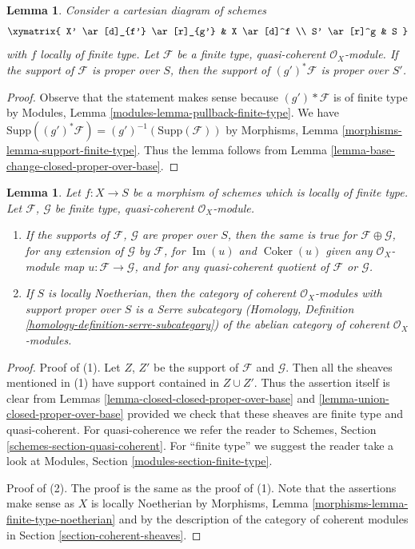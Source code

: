 \documentclass[10pt,a4paper]{amsart}
\theoremstyle{plain}
\newtheorem{lemma}[subsection]{Lemma}
\theoremstyle{definition}
\theoremstyle{remark}
\numberwithin{equation}{subsection}
\def\Im{\mathop{\mathrm{Im}}}
\def\Coker{\mathop{\mathrm{Coker}}}
\begin{document}
\begin{lemma}
\label{lemma-base-change-module-support-proper-over-base}
Consider a cartesian diagram of schemes
$$
\xymatrix{
X' \ar[d]_{f'} \ar[r]_{g'} & X \ar[d]^f \\
S' \ar[r]^g & S
}
$$
with $f$ locally of finite type. Let $\mathcal{F}$ be a
finite type, quasi-coherent $\mathcal{O}_X$-module.
If the support of $\mathcal{F}$ is proper over $S$, then
the support of $(g')^*\mathcal{F}$ is proper over $S'$.
\end{lemma}

\begin{proof}
Observe that the statement makes sense because
$(g')*\mathcal{F}$ is of finite type by
Modules, Lemma \ref{modules-lemma-pullback-finite-type}.
We have $\text{Supp}((g')^*\mathcal{F}) = (g')^{-1}(\text{Supp}(\mathcal{F}))$
by Morphisms, Lemma \ref{morphisms-lemma-support-finite-type}.
Thus the lemma follows from
Lemma \ref{lemma-base-change-closed-proper-over-base}.
\end{proof}

\begin{lemma}
\label{lemma-cat-module-support-proper-over-base}
Let $f : X \to S$ be a morphism of schemes which is locally
of finite type. Let $\mathcal{F}$, $\mathcal{G}$
be finite type, quasi-coherent $\mathcal{O}_X$-module.
\begin{enumerate}
\item If the supports of $\mathcal{F}$, $\mathcal{G}$
are proper over $S$, then the same is true
for $\mathcal{F} \oplus \mathcal{G}$, for any extension
of $\mathcal{G}$ by $\mathcal{F}$, for $\Im(u)$ and $\Coker(u)$
given any $\mathcal{O}_X$-module map $u : \mathcal{F} \to \mathcal{G}$,
and for any quasi-coherent quotient of $\mathcal{F}$ or $\mathcal{G}$.
\item If $S$ is locally Noetherian, then the category of
coherent $\mathcal{O}_X$-modules with support proper over
$S$ is a Serre subcategory (Homology, Definition
\ref{homology-definition-serre-subcategory})
of the abelian category of
coherent $\mathcal{O}_X$-modules.
\end{enumerate}
\end{lemma}

\begin{proof}
Proof of (1). Let $Z$, $Z'$ be the support of $\mathcal{F}$
and $\mathcal{G}$. Then all the sheaves mentioned in (1)
have support contained in $Z \cup Z'$. Thus the assertion itself
is clear from Lemmas \ref{lemma-closed-closed-proper-over-base} and
\ref{lemma-union-closed-proper-over-base}
provided we check that these sheaves are finite type
and quasi-coherent. For quasi-coherence we refer the reader to
Schemes, Section \ref{schemes-section-quasi-coherent}.
For ``finite type'' we suggest the reader take a look at
Modules, Section \ref{modules-section-finite-type}.

\medskip\noindent
Proof of (2). The proof is the same as the proof of (1). Note that
the assertions make sense as $X$ is locally Noetherian by
Morphisms, Lemma \ref{morphisms-lemma-finite-type-noetherian}
and by the description of the category of coherent
modules in Section \ref{section-coherent-sheaves}.
\end{proof}
\end{document}
